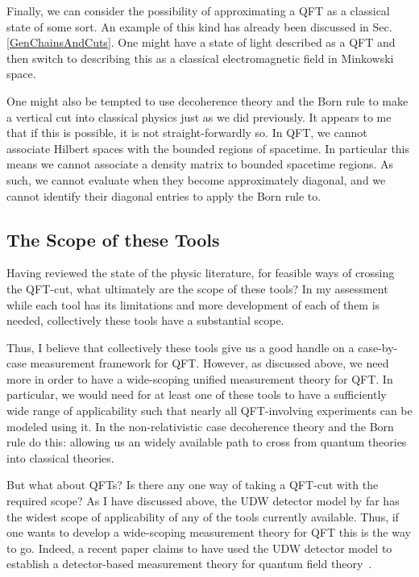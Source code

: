 \documentclass[prd,twocolumn,superscriptaddress,floatfix,amsmath,amssymb,amsfonts,nofootinbib]{revtex4-2}
\begin{document}
Finally, we can consider the possibility of approximating a QFT as a classical state of some sort. An example of this kind has already been discussed in Sec. \ref{GenChainsAndCuts}. One might have a state of light described as a QFT and then switch to describing this as a classical electromagnetic field in Minkowski space.

One might also be tempted to use decoherence theory and the Born rule to make a vertical cut into classical physics just as we did previously. It appears to me that if this is possible, it is not straight-forwardly so. In QFT, we cannot associate Hilbert spaces with the bounded regions of spacetime. In particular this means we cannot associate a density matrix to bounded spacetime regions. As such, we cannot evaluate when they become approximately diagonal, and we cannot identify their diagonal entries to apply the Born rule to.

\subsection{The Scope of these Tools}
Having reviewed the state of the physic literature, for feasible ways of crossing the QFT-cut, what ultimately are the scope of these tools? In my assessment while each tool has its limitations and more development of each of them is needed, collectively these tools have a substantial scope.

Thus, I believe that collectively these tools give us a good handle on a case-by-case measurement framework for QFT. However, as discussed above, we need more in order to have a wide-scoping unified measurement theory for QFT. In particular, we would need for at least one of these tools to have a sufficiently wide range of applicability such that nearly all QFT-involving experiments can be modeled using it. In the non-relativistic case decoherence theory and the Born rule do this: allowing us an widely available path to cross from quantum theories into classical theories. 

But what about QFTs? Is there any one way of taking a QFT-cut with the required scope? As I have discussed above, the UDW detector model by far has the widest scope of applicability of any of the tools currently available. Thus, if one wants to develop a wide-scoping measurement theory for QFT this is the way to go. Indeed, a recent paper claims to have used the UDW detector model to establish a detector-based measurement theory for quantum field theory~\cite{pologomez2021detectorbased}.
\end{document}
